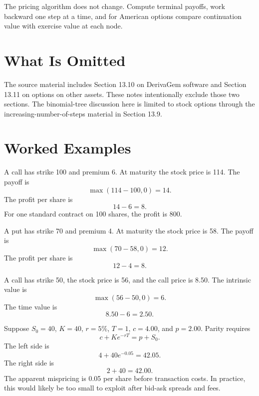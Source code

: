 The pricing algorithm does not change. Compute terminal payoffs, work backward
one step at a time, and for American options compare continuation value with
exercise value at each node.

\section{What Is Omitted}

The source material includes Section 13.10 on DerivaGem software and Section
13.11 on options on other assets. These notes intentionally exclude those two
sections. The binomial-tree discussion here is limited to stock options through
the increasing-number-of-steps material in Section 13.9.

\section{Worked Examples}

\begin{exmp}
A call has strike 100 and premium 6. At maturity the stock price is 114. The
payoff is
\[
    \max(114-100,0)=14.
\]
The profit per share is
\[
    14-6=8.
\]
For one standard contract on 100 shares, the profit is 800.
\end{exmp}

\begin{exmp}
A put has strike 70 and premium 4. At maturity the stock price is 58. The payoff
is
\[
    \max(70-58,0)=12.
\]
The profit per share is
\[
    12-4=8.
\]
\end{exmp}

\begin{exmp}
A call has strike 50, the stock price is 56, and the call price is 8.50. The
intrinsic value is
\[
    \max(56-50,0)=6.
\]
The time value is
\[
    8.50-6=2.50.
\]
\end{exmp}

\begin{exmp}
Suppose $S_0=40$, $K=40$, $r=5\%$, $T=1$, $c=4.00$, and $p=2.00$. Parity
requires
\[
    c+Ke^{-rT}
    =
    p+S_0.
\]
The left side is
\[
    4+40e^{-0.05}=42.05.
\]
The right side is
\[
    2+40=42.00.
\]
The apparent mispricing is 0.05 per share before transaction costs. In practice,
this would likely be too small to exploit after bid-ask spreads and fees.
\end{exmp}

